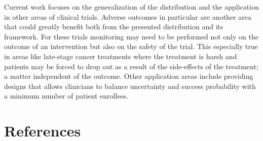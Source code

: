 \documentclass[review]{elsarticle}
\begin{document}
Current work focuses on the generalization of the distribution and the application in other areas of clinical trials. Adverse outcomes in particular are another area that could greatly benefit both from the presented distribution and its framework. For these trials monitoring may need to be performed not only on the outcome of an intervention but also on the safety of the trial. This especially
true in areas like late-stage cancer treatments where the treatment is harsh
and patients may be forced to drop out as a result of the side-effects of the
treatment; a matter independent of the outcome. Other application areas
include providing designs that allows clinicians to balance uncertainty and
success probability with a minimum number of patient enrollees.


\section*{References}


\end{document}
